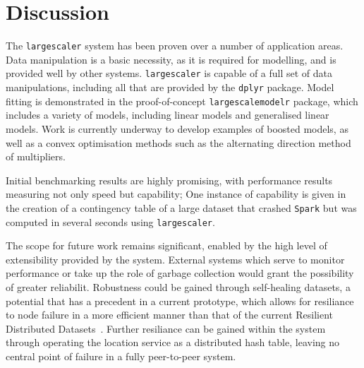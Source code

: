 \section{Discussion}

The \texttt{largescaler} system has been proven over a number of application areas.
Data manipulation is a basic necessity, as it is required for modelling, and is provided well by other systems.
\texttt{largescaler} is capable of a full set of data manipulations, including all that are provided by the \texttt{dplyr} package.
Model fitting is demonstrated in the proof-of-concept \texttt{largescalemodelr} package, which includes a variety of models, including linear models and generalised linear models.
Work is currently underway to develop examples of boosted models, as well as a convex optimisation methods such as the alternating direction method of multipliers.

Initial benchmarking results are highly promising, with performance results measuring not only speed but capability;
One instance of capability is given in the creation of a contingency table of a large dataset that crashed \texttt{Spark} but was computed in several seconds using \texttt{largescaler}.

The scope for future work remains significant, enabled by the high level of extensibility provided by the system.
External systems which serve to monitor performance or take up the role of garbage collection would grant the possibility of greater reliabilit.
Robustness could be gained through self-healing datasets, a potential that has a precedent in a current prototype, which allows for resiliance to node failure in a more efficient manner than that of the current Resilient Distributed Datasets~\cite{zaharia2012resilient}.
Further resiliance can be gained within the system through operating the location service as a distributed hash table, leaving no central point of failure in a fully peer-to-peer system.
